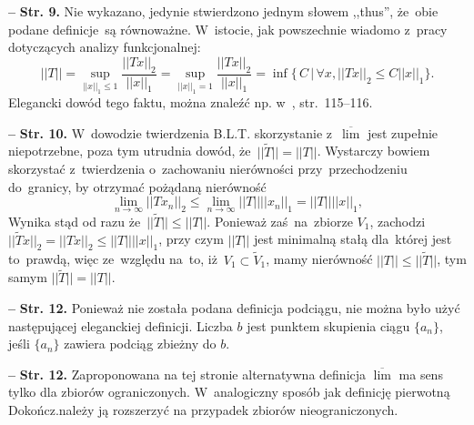\documentclass[a4paper,11pt]{article}
\newcommand{\spaceThree}{0.5em}
\newcommand{\fr}{\frac}
\newcommand{\ol}{\overline}
\newcommand{\wt}{\widetilde}
\newcommand{\ra}{\rightarrow}
\newcommand{\Lim}{\lim\limits}
\newcommand{\Limsup}{\ol{\lim}}
\newcommand{\norm}[1]{\left|\left| #1 \right|\right|}
\newcommand{\tb}{\textbf}
\newcommand{\noi}{\noindent}
\newcommand{\start}{\noi \tb{--} {}}
\newcommand{\Str}[1]{\tb{Str. #1.}}
\newcommand{\Dok}{{\color{red} Dokończ.}}
\begin{document}
\vspace{\spaceThree}


\start \Str{9} Nie wykazano, jedynie stwierdzono jednym słowem
,,thus'', że~obie podane definicje~są równoważne. W~istocie, jak
powszechnie wiadomo z~pracy dotyczących analizy funkcjonalnej:
\begin{displaymath}
  \norm{ T } = \sup_{ \norm{ x }_{ 1 } \leq 1 } \fr{ \norm{ T x }_{ 2 } }
  { \norm{ x }_{ 1 } }
  = \sup_{ \norm{ x }_{ 1 } = 1 } \fr{ \norm{ T x }_{ 2 } }
  { \norm{ x }_{ 1 } } = \inf \{ \, C \, | \, \forall x,
  \norm{ T x }_{ 2 } \leq C \norm{ x }_{ 1 } \}.
\end{displaymath}
Elegancki dowód tego faktu, można znaleźć np. w~\cite{Chm04},
str.~115--116.

\start \Str{10} W~dowodzie twierdzenia B.L.T. skorzystanie z~$\Limsup$
jest zupełnie niepotrzebne, poza tym utrudnia dowód,
że~$|| \tilde{ T } || = \norm{ T }$. Wystarczy bowiem skorzystać
z~twierdzenia o~zachowaniu nierówności przy~przechodzeniu do~granicy,
by otrzymać pożądaną nierówność
\begin{displaymath}
  \Lim_{ n \ra \infty } \norm{ T x_{ n } }_{ 2 }
  \leq \Lim_{ n \ra \infty } \norm{ T } \norm{ x_{ n } }_{ 1 }
  = \norm{ T } \norm{ x }_{ 1 },
\end{displaymath}
Wynika stąd od razu że~$|| \wt{ T } || \leq \norm{ T }$. Ponieważ
zaś~na~zbiorze $V_{ 1 }$, zachodzi
$|| \wt{ T } x ||_{ 2 } = \norm{ T x }_{ 2 } \leq \norm{ T } \norm{ x
}_{ 1 }$, przy czym $\norm{ T }$ jest minimalną stałą dla~której jest
to~prawdą, więc ze~względu na~to, iż~$V_{ 1 } \subset \wt{ V }_{ 1 }$,
mamy nierówność $\norm{ T } \leq || \wt{ T } ||$, tym samym
$|| \wt{ T } || = \norm{ T }$.

\start \Str{12} Ponieważ nie została podana definicja podciągu, nie
można było użyć następującej eleganckiej definicji. Liczba $b$ jest
punktem skupienia ciągu $\{ a_{ n } \}$, jeśli $\{ a_{ n } \}$ zawiera
podciąg zbieżny do $b$.

\start \Str{12} Zaproponowana na tej stronie alternatywna definicja
$\Limsup$ ma sens tylko dla zbiorów ograniczonych. W~analogiczny
sposób jak definicję pierwotną \Dok należy ją rozszerzyć na przypadek
zbiorów nieograniczonych.
\end{document}
